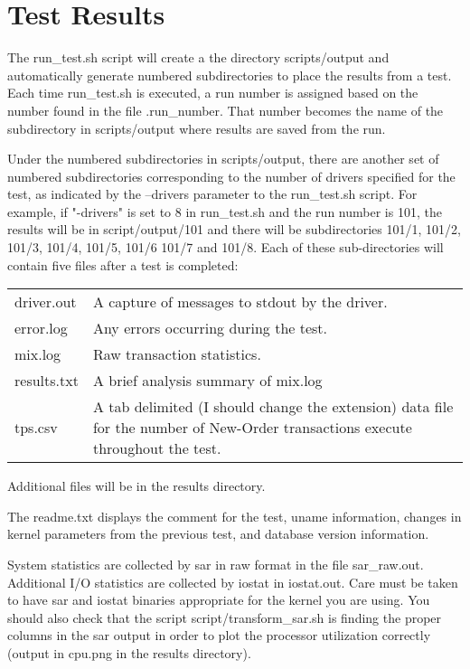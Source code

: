 \documentclass{article}
\begin{document}
\section{Test Results}

The run\_test.sh script will create a the directory scripts/output and
automatically generate numbered subdirectories to place the results from a
test.  Each time run\_test.sh is executed, a run number is assigned based on
the number found in the file .run\_number.  That number becomes the name of
the subdirectory in scripts/output where results are saved from the run.

\noindent
Under the numbered subdirectories in scripts/output, there are another set of
numbered subdirectories corresponding to the number of drivers specified for
the test, as indicated by the --drivers parameter to the run\_test.sh script.
For example, if "-drivers" is set to 8 in run\_test.sh and the run number is
101, the results will be in script/output/101 and there will be subdirectories
101/1, 101/2, 101/3, 101/4, 101/5, 101/6 101/7 and 101/8.  Each of these
sub-directories will contain five files after a test is completed:

\begin{tabular}[c]{ll}
driver.out	&	A capture of messages to stdout by the driver. \\
error.log	&	Any errors occurring during the test. \\
mix.log		&	Raw transaction statistics. \\
results.txt	&	A brief analysis summary of mix.log \\
tps.csv		&	A tab delimited (I should change the extension) data
			file for the number of New-Order transactions execute
			throughout the test. \\
\end{tabular}

\noindent
Additional files will be in the results directory.

\noindent
The readme.txt displays the comment for the test, uname  information, changes
in kernel parameters from the previous test, and database version information.

\noindent
System statistics are collected by sar in raw format in the file sar\_raw.out.
Additional I/O statistics are collected by iostat in iostat.out.  Care must be
taken to have sar and iostat binaries appropriate for the kernel you are
using.  You should also check that the script script/transform\_sar.sh is
finding the proper columns in the sar output in order to plot the processor
utilization correctly (output in cpu.png in the results directory).
\end{document}
